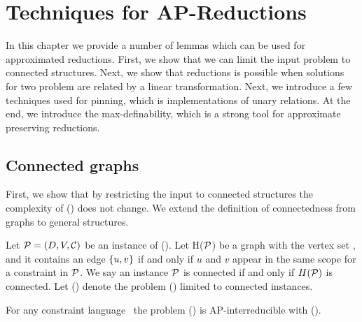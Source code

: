 \chapter{Techniques for AP-Reductions}
In this chapter we provide a number of lemmas which can be used for approximated reductions.
First, we show that we can limit the input problem to connected structures. 
Next, we show that reductions is possible when solutions for two problem are related by a 
linear transformation. Next, we introduce a few techniques used for pinning, which is
implementations of unary relations. At the end, we introduce the max-definability, which 
is a strong tool for approximate preserving reductions. 

\section{Connected graphs}
First, we show that by restricting the input to connected structures the complexity of 
\ccsp(\mrelset) does not change. We extend the definition of connectedness from graphs
to general structures.

Let \(\mathcal{P} = (D, V, \mathcal{C})\) be an instance of \ccsp(\mrelset)\@.
Let H(\(\mathcal{P}\)) be a graph
with the vertex set \mV, and it contains an edge \(\{{u,v}\}\) if and only if 
\(u\) and \(v\) appear in the same scope for a constraint in \(\mathcal{P}\)\@.
We say an instance \(\mathcal{P}\) is connected if and only if \(H(\mathcal{P})\) is connected.
Let \cccsp(\mrelset) denote the problem \ccsp(\mrelset) limited to connected instances.

\begin{lemma} \label{lem:connected}
For any constraint language \mrelset\ the problem \ccsp(\mrelset) is AP-interreducible with
\cccsp(\mrelset)\@.
\end{lemma}

